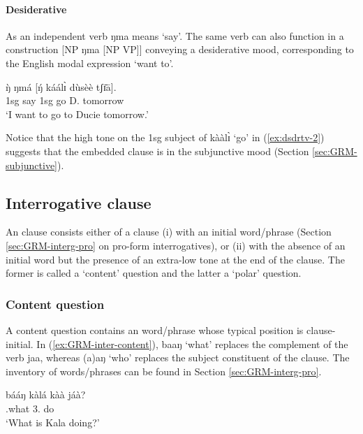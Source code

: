 \paragraph{Desiderative}
\label{sec:GRM-desiderative-mood}


As an independent verb {\sls ŋma} means `say'. The same verb can also function in a construction [NP {\sls ŋma} [NP VP]]  conveying a desiderative mood,  corresponding to the English modal expression `want to'.

\ea\label{ex:dsdrtv-2}
\gll ŋ̀ ŋmá [ŋ́ káálɪ̀ dùsèè tʃɪ̄ā].\\
  {\sc 1sg} say  {\sc 1sg} go D. tomorrow\\
\glt  `I want to go to Ducie tomorrow.'
\z 

 Notice that the high tone on the  {\sc 1sg}  subject of {\sls kààlɪ̀} `go'  in (\ref{ex:dsdrtv-2})  suggests that the embedded clause is in the subjunctive mood (Section \ref{sec:GRM-subjunctive}).

 
 \subsection{Interrogative clause}
\label{sec:GRM-interr-clause}

An  clause consists either of a clause (i) with an initial
 word/phrase (Section \ref{sec:GRM-interg-pro} on pro-form 
interrogatives), or (ii) with the absence of an initial 
word but the presence of an extra-low tone at the end of the clause. The former
is called a `content' question and the latter a `polar' question. 

\subsubsection{Content question}
\label{sec:GRM-interr-content}

A content question contains an  word/phrase whose typical position is clause-initial. In (\ref{ex:GRM-inter-content}), {\sls baaŋ} `what' replaces the complement of the verb {\sls jaa}, whereas {\sls (a)aŋ} `who'  replaces the subject constituent of the clause. The inventory of  words/phrases can be found in Section \ref{sec:GRM-interg-pro}.

\ea\label{ex:GRM-inter-content}
\ea\label{ex:GRM-inter-content-what}
\gll bááŋ kàlá kàà jáà?\\
{\q}.what {3.\sg} {\ipfv} do\\
 \glt  `What is Kala doing?' 

